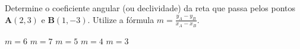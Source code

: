Determine o coeficiente angular (ou declividade) da reta que passa pelos pontos $ \mathbf{A}(2, 3) $ e $ \mathbf{B}(1,-3) $. Utilize a fórmula $m=\frac{y_A-y_B}{x_A-x_B}$.

$m=6$
$m=7$
$m=5$
$m=4$
$m=3$






